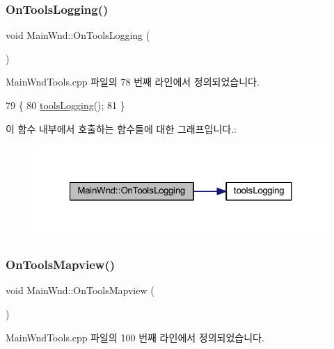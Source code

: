 \subsubsection{\texorpdfstring{On\+Tools\+Logging()}{OnToolsLogging()}}
{\footnotesize\ttfamily void Main\+Wnd\+::\+On\+Tools\+Logging (\begin{DoxyParamCaption}{ }\end{DoxyParamCaption})\hspace{0.3cm}{\ttfamily [protected]}}



Main\+Wnd\+Tools.\+cpp 파일의 78 번째 라인에서 정의되었습니다.


\begin{DoxyCode}
79 \{
80   \mbox{\hyperlink{_main_wnd_tools_8cpp_ad0c87517314e3666bbeec33d320d8354}{toolsLogging}}();
81 \}
\end{DoxyCode}
이 함수 내부에서 호출하는 함수들에 대한 그래프입니다.\+:
\nopagebreak
\begin{figure}[H]
\begin{center}
\leavevmode
\includegraphics[width=321pt]{class_main_wnd_a18b152a47c0ce3d299120f5b3631232b_cgraph}
\end{center}
\end{figure}
\mbox{\label{class_main_wnd_ab80b793bf5f38350a4c213677583ad24}} 
\subsubsection{\texorpdfstring{On\+Tools\+Mapview()}{OnToolsMapview()}}
{\footnotesize\ttfamily void Main\+Wnd\+::\+On\+Tools\+Mapview (\begin{DoxyParamCaption}{ }\end{DoxyParamCaption})\hspace{0.3cm}{\ttfamily [protected]}}



Main\+Wnd\+Tools.\+cpp 파일의 100 번째 라인에서 정의되었습니다.


